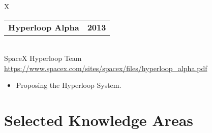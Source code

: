 \documentclass[10pt]{article}
\newcommand{\tabularxwidth}{\textwidth}
\begin{document}
    
        \begin{minipage}{\tabularxwidth}
        \begin{tabularx}{\tabularxwidth}{X}
            {
                \begin{tabularx}{\tabularxwidth}{@{}X r}
                    \textbf{Hyperloop Alpha} &
                    \textbf{
        2013} \\
                \end{tabularx}
            } \\
            SpaceX Hyperloop Team \\

            
            
                \url{https://www.spacex.com/sites/spacex/files/hyperloop_alpha.pdf} \\
            
            
        \end{tabularx}

        \begin{itemize}[noitemsep, topsep=3pt, parsep=0pt, partopsep=0pt]
            
                \item 
    Proposing the Hyperloop System.
            
        \end{itemize}

        

        \end{minipage}
    


    

    


    
        \section{Selected Knowledge Areas}
\end{document}
